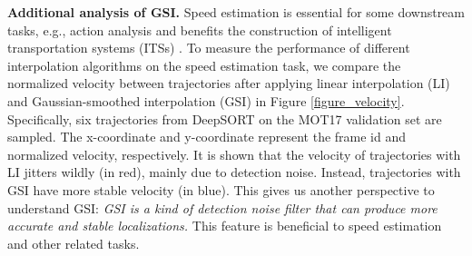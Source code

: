 \documentclass[lettersize,journal]{IEEEtran}
\begin{document}
\noindent \textbf{Additional analysis of GSI.}
Speed estimation is essential for some downstream tasks, e.g., action analysis \cite{du2022pami}
and benefits the construction of intelligent transportation systems (ITSs) \cite{fernandez2021vision}.
To measure the performance of different interpolation algorithms on the speed estimation task,
we compare the normalized velocity between trajectories 
after applying linear interpolation (LI) and Gaussian-smoothed interpolation (GSI) in Figure \ref{figure_velocity}.
Specifically, six trajectories from DeepSORT on the MOT17 validation set are sampled.
The x-coordinate and y-coordinate represent the frame id and normalized velocity, respectively.
It is shown that the velocity of trajectories with LI jitters wildly (in red), mainly due to detection noise.
Instead, trajectories with GSI have more stable velocity (in blue).
This gives us another perspective to understand GSI: 
\textit{GSI is a kind of detection noise filter that can produce more accurate and stable localizations.}
This feature is beneficial to speed estimation and other related tasks.
\end{document}
